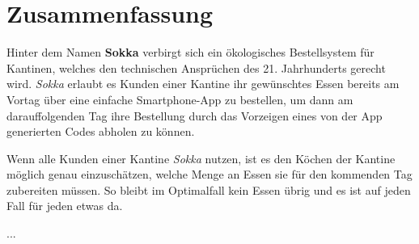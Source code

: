 \section*{Zusammenfassung}

Hinter dem Namen \textbf{Sokka} verbirgt sich ein ökologisches Bestellsystem für Kantinen, welches den technischen Ansprüchen des 21. Jahrhunderts gerecht wird. \textit{Sokka} erlaubt es Kunden einer Kantine ihr gewünschtes Essen bereits am Vortag über eine einfache Smartphone-App zu bestellen, um dann am darauffolgenden Tag ihre Bestellung durch das Vorzeigen eines von der App generierten Codes abholen zu können.

Wenn alle Kunden einer Kantine \textit{Sokka} nutzen, ist es den Köchen der Kantine möglich genau einzuschätzen, welche Menge an Essen sie für den kommenden Tag zubereiten müssen. So bleibt im Optimalfall kein Essen übrig und es ist auf jeden Fall für jeden etwas da.

...

\newpage